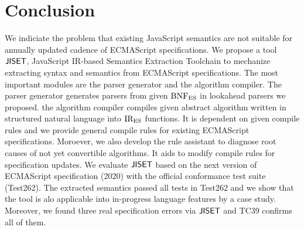 \section{Conclusion}\label{sec:conclude}

We indiciate the problem that existing JavaScript semantics are not suitable for
annually updated cadence of ECMAScript specifications. We propose a tool \( \text{\sf JISET} \),
JavaScript IR-based Semantics Extraction Toolchain to mechanize extracting syntax
and semantics from ECMAScript specifications. The most important modules are
the parser generator and the algorithm compiler. The parser generator generates
parsers from given \( \text{BNF}_{\text{ES}} \) in lookahead parsers we proposed. the algorithm
compiler compiles given abstract algorithm written in structured natural language
into \( \text{IR}_\text{ES} \) functions. It is dependent on given compile rules and we provide
general compile rules for existing ECMAScript specifications. Moroever, we also
develop the rule assistant to diagnose root causes of not yet convertible algorithms.
It aids to modify compile rules for specification updates. We evaluate \( \text{\sf JISET} \)
based on the next version of ECMAScript specification (2020) with the official conformance test
suite (Test262). The extracted semantics passed all  tests in Test262
and we show that the tool is alo applicable into in-progress language features
by a case study. Moreover, we found three real specification errors via \( \text{\sf JISET} \)
and TC39 confirms all of them.
